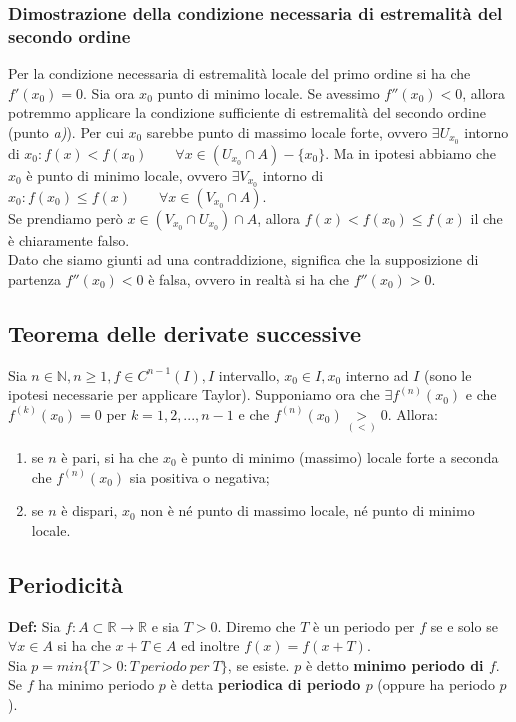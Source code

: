 \documentclass{article}
\begin{document}
\subsubsection{Dimostrazione della condizione necessaria di estremalità del secondo ordine}
Per la condizione necessaria di estremalità locale del primo ordine si ha che $f'(x_0) = 0$. Sia ora $x_0$ punto di minimo locale. Se avessimo $f''(x_0) < 0$, allora potremmo applicare la condizione sufficiente di estremalità del secondo ordine (punto \textit{a)}). Per cui $x_0$ sarebbe punto di massimo locale forte, ovvero $\exists U_{x_0}$ intorno di $x_0 : f(x) < f(x_0) \qquad \forall x \in (U_{x_0} \cap A) - \{x_0\}$. Ma in ipotesi abbiamo che $x_0$ è punto di minimo locale, ovvero $\exists V_{x_0}$ intorno di $x_0 : f(x_0) \leq f(x) \qquad \forall x \in (V_{x_0} \cap A)$.\\
Se prendiamo però $x \in (V_{x_0} \cap U_{x_0}) \cap A$, allora $f(x) < f(x_0) \leq f(x)$ il che è chiaramente falso. \\
Dato che siamo giunti ad una contraddizione, significa che la supposizione di partenza $f''(x_0) < 0$ è falsa, ovvero in realtà si ha che $f''(x_0) > 0$.

\subsection{Teorema delle derivate successive}
Sia $n \in \mathbb{N}, n \geq 1, f \in C^{n - 1}(I), I$ intervallo, $x_0 \in I, x_0$ interno ad $I$ (sono le ipotesi necessarie per applicare Taylor). Supponiamo ora che $\exists f^{(n)}(x_0)$ e che $f^{(k)}(x_0) = 0$ per $k = 1, 2, ..., n - 1$ e che $f^{(n)}(x_0) \underset{(<)}{>} 0$. Allora:
\begin{enumerate}
    \item se $n$ è pari, si ha che $x_0$ è punto di minimo (massimo) locale forte a seconda che $f^{(n)}(x_0)$ sia positiva o negativa;
    \item se $n$ è dispari, $x_0$ non è né punto di massimo locale, né punto di minimo locale.
\end{enumerate}

\subsection{Periodicità}
\textbf{Def:} Sia $f: A \subset \mathbb{R} \xrightarrow{} \mathbb{R}$ e sia $T > 0$. Diremo che $T$ è un periodo per $f$ se e solo se $\forall x \in A$ si ha che $x + T \in A$ ed inoltre $f(x) = f(x + T)$.\\
Sia $p = min\{T > 0 : T \ periodo \ per \ T\}$, se esiste. $p$ è detto \textbf{minimo periodo di $f$}. Se $f$ ha minimo periodo $p$ è detta \textbf{periodica di periodo $p$} (oppure ha periodo $p$).\\
\end{document}
